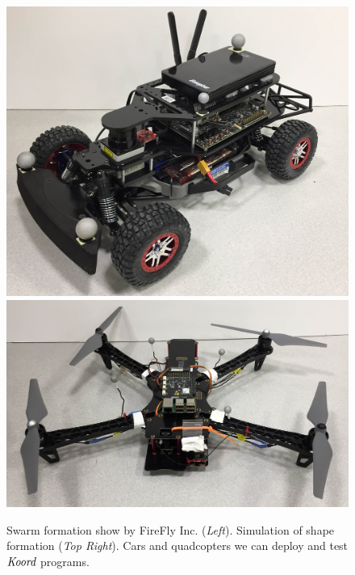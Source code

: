 \begin{figure}[h!]
\begin{minipage}{0.55\columnwidth}
	\includegraphics[width=0.42\linewidth]{figs/car.jpg}
	\includegraphics[width=0.56\linewidth]{figs/quad.jpg}
\end{minipage}%
	\caption{
        Swarm formation show by FireFly Inc. (\emph{Left}).
        Simulation of shape formation (\emph{Top Right}).
        Cars and quadcopters we can deploy and test $\emph{Koord}$ programs.}
    \label{fig:firefly}
\end{figure}



